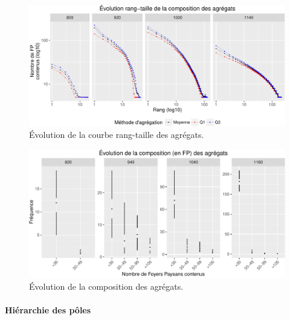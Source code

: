 \begin{figure}[H]
	\captionsetup{width=\linewidth}
	\includegraphics[width=.8\linewidth]{img/resultats/v0_rt_agregats.pdf}
	\caption{Évolution de la courbe rang-taille des agrégats.} 
	\label{fig:rt-agregats-v0} 
\end{figure}

\begin{figure}[H]
	\captionsetup{width=\linewidth}
	\includegraphics[width=.8\linewidth]{img/resultats/v0_compo_agregats.pdf}
	\caption{Évolution de la composition des agrégats.} 
	\label{fig:compo-agregats-v0} 
\end{figure}

\paragraph{Hiérarchie des pôles}

